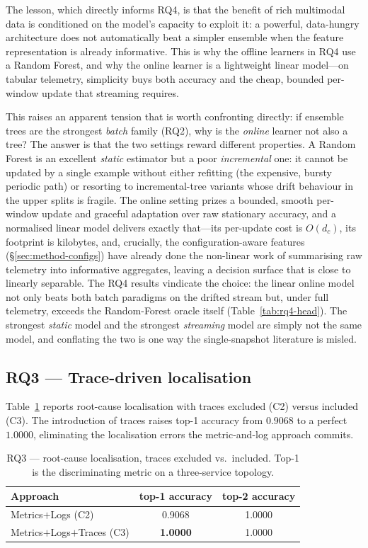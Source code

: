 \documentclass[acmsmall]{acmart}
\begin{document}
The lesson, which directly informs RQ4, is that the benefit of rich multimodal data is conditioned on the model's capacity to exploit it: a powerful, data-hungry architecture does not automatically beat a simpler ensemble when the feature representation is already informative. This is why the offline learners in RQ4 use a Random Forest, and why the online learner is a lightweight linear model---on tabular telemetry, simplicity buys both accuracy and the cheap, bounded per-window update that streaming requires.

This raises an apparent tension that is worth confronting directly: if ensemble trees are the strongest \emph{batch} family (RQ2), why is the \emph{online} learner not also a tree? The answer is that the two settings reward different properties. A Random Forest is an excellent \emph{static} estimator but a poor \emph{incremental} one: it cannot be updated by a single example without either refitting (the expensive, bursty periodic path) or resorting to incremental-tree variants whose drift behaviour in the upper splits is fragile. The online setting prizes a bounded, smooth per-window update and graceful adaptation over raw stationary accuracy, and a normalised linear model delivers exactly that---its per-update cost is $O(d_c)$, its footprint is kilobytes, and, crucially, the configuration-aware features (\S\ref{sec:method-configs}) have already done the non-linear work of summarising raw telemetry into informative aggregates, leaving a decision surface that is close to linearly separable. The RQ4 results vindicate the choice: the linear online model not only beats both batch paradigms on the drifted stream but, under full telemetry, exceeds the Random-Forest oracle itself (Table~\ref{tab:rq4-head}). The strongest \emph{static} model and the strongest \emph{streaming} model are simply not the same model, and conflating the two is one way the single-snapshot literature is misled.

\subsection{RQ3 --- Trace-driven localisation}\label{sec:res-rq3}

Table~\ref{tab:rq3} reports root-cause localisation with traces excluded (C2) versus included (C3). The introduction of traces raises top-1 accuracy from $0.9068$ to a perfect $1.0000$, eliminating the localisation errors the metric-and-log approach commits.

\begin{table}[t]
\caption{RQ3 --- root-cause localisation, traces excluded vs.\ included. Top-1 is the discriminating metric on a three-service topology.}\label{tab:rq3}
\begin{tabular}{@{}lcc@{}}
\toprule
Approach & top-1 accuracy & top-2 accuracy \\
\midrule
Metrics${+}$Logs (C2)            & 0.9068 & 1.0000 \\
Metrics${+}$Logs${+}$Traces (C3) & \textbf{1.0000} & 1.0000 \\
\bottomrule
\end{tabular}
\end{table}
\end{document}

